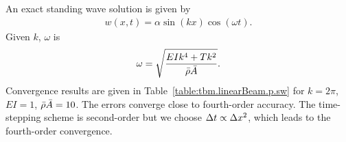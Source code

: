\documentclass[11pt]{article}
\newcommand{\dt}{{\Delta t}}
\begin{document}
An exact standing wave solution is given by
\begin{align*}
   w(x,t) = \alpha \sin(k x)\cos(\omega t) .
\end{align*}
Given $k$, $\omega$ is 
\begin{align*}
   \omega =\sqrt{ \frac{E I k^4 + T k^2}{\bar{\rho}\bar{A}} } .
\end{align*}
Convergence results are given in Table~\ref{table:tbm.linearBeam.p.sw} for $k=2\pi$, $E I=1$, $\bar{\rho}\bar{A}=10$.
The errors converge close to fourth-order accuracy. The time-stepping scheme is second-order but 
we choose $\dt \propto \dx^2$, which leads to the fourth-order convergence.





%
%
\end{document}
